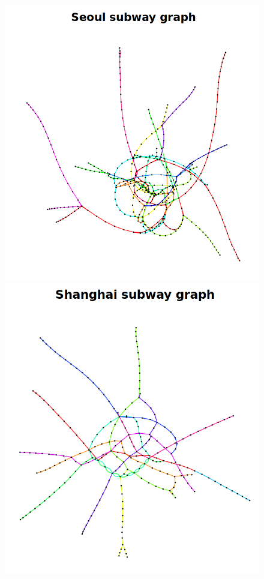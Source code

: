 \begin{figure}[!htb]
\begin{minipage}[b]{0.24\textwidth}
    \end{minipage}
    \hfill
    \begin{minipage}[b]{0.24\textwidth}
        \includegraphics[width=\textwidth]{images/CityGraph_Seoul.png}

    \end{minipage}
    \hfill
    \begin{minipage}[b]{0.24\textwidth}
        \includegraphics[width=\textwidth]{images/CityGraph_Shanghai.png}


\end{minipage}
\end{figure}
